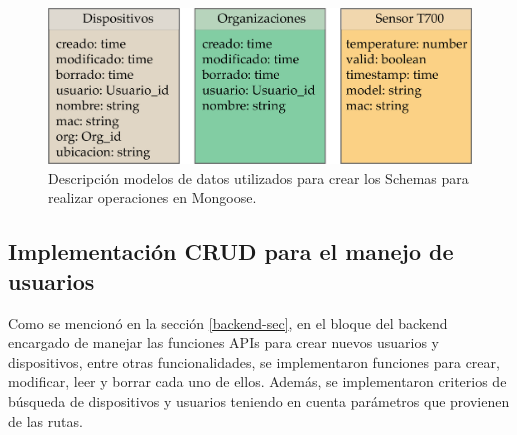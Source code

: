 \begin{figure}[htpb]
	\centering
	\includegraphics[scale=.75]{./Figures/modelos-mongo.png}
	\caption[Modelos de datos utilizados en Mongoose]{Descripción modelos de datos utilizados para crear los Schemas para realizar operaciones en Mongoose.}
	\label{fig:modelos-mongo}
\end{figure}


\subsection{Implementación CRUD para el manejo de usuarios }

Como se mencionó en la sección \ref{backend-sec}, en el bloque del backend encargado de manejar las funciones APIs para crear nuevos usuarios y dispositivos, entre otras funcionalidades, se implementaron funciones para crear, modificar, leer y borrar cada uno de ellos. Además, se implementaron criterios de búsqueda de dispositivos y usuarios teniendo en cuenta parámetros que provienen de las rutas. 

